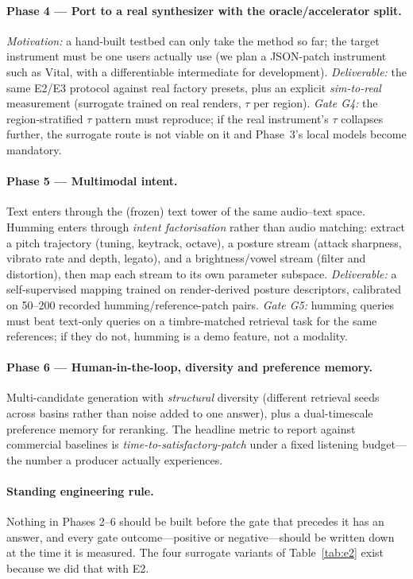 \documentclass[11pt]{article}
\begin{document}
\paragraph{Phase 4 --- Port to a real synthesizer with the oracle/accelerator
split.} \emph{Motivation:} a hand-built testbed can only take the method so far;
the target instrument must be one users actually use (we plan a JSON-patch
instrument such as Vital, with a differentiable intermediate for development).
\emph{Deliverable:} the same E2/E3 protocol against real factory presets, plus
an explicit \emph{sim-to-real} measurement (surrogate trained on real renders,
$\tau$ per region). \emph{Gate G4:} the region-stratified $\tau$ pattern must
reproduce; if the real instrument's $\tau$ collapses further, the surrogate
route is not viable on it and Phase~3's local models become mandatory.

\paragraph{Phase 5 --- Multimodal intent.}
Text enters through the (frozen) text tower of the same audio--text space.
Humming enters through \emph{intent factorisation} rather than audio matching:
extract a pitch trajectory (tuning, keytrack, octave), a posture stream (attack
sharpness, vibrato rate and depth, legato), and a brightness/vowel stream
(filter and distortion), then map each stream to its own parameter subspace.
\emph{Deliverable:} a self-supervised mapping trained on render-derived posture
descriptors, calibrated on 50--200 recorded humming/reference-patch pairs.
\emph{Gate G5:} humming queries must beat text-only queries on a timbre-matched
retrieval task for the same references; if they do not, humming is a demo
feature, not a modality.

\paragraph{Phase 6 --- Human-in-the-loop, diversity and preference memory.}
Multi-candidate generation with \emph{structural} diversity (different retrieval
seeds across basins rather than noise added to one answer), plus a
dual-timescale preference memory for reranking. The headline metric to report
against commercial baselines is \emph{time-to-satisfactory-patch} under a fixed
listening budget---the number a producer actually experiences.

\paragraph{Standing engineering rule.} Nothing in Phases 2--6 should be built
before the gate that precedes it has an answer, and every gate
outcome---positive or negative---should be written down at the time it is
measured. The four surrogate variants of Table~\ref{tab:e2} exist because we did
that with E2.
\end{document}

